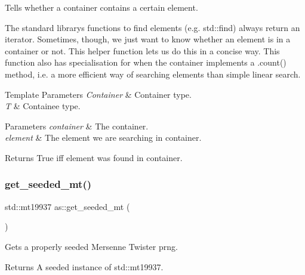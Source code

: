 Tells whether a container contains a certain element. 

The standard library\textquotesingle{}s functions to find elements (e.\+g. std\+::find) always return an iterator. Sometimes, though, we just want to know whether an element is in a container or not. This helper function lets us do this in a concise way. This function also has specialisation for when the container implements a .count() method, i.\+e. a more efficient way of searching elements than simple linear search.


\begin{DoxyTemplParams}{Template Parameters}
{\em Container} & Container type. \\
\hline
{\em T} & Containee type. \\
\hline
\end{DoxyTemplParams}

\begin{DoxyParams}{Parameters}
{\em container} & The container. \\
\hline
{\em element} & The element we are searching in {\ttfamily container}. \\
\hline
\end{DoxyParams}
\begin{DoxyReturn}{Returns}
True iff {\ttfamily element} was found in {\ttfamily container}. 
\end{DoxyReturn}
\mbox{\label{namespaceas_a4c9b0919bddf60796e9cc81ecd7d5bb2}} 
\subsubsection{\texorpdfstring{get\+\_\+seeded\+\_\+mt()}{get\_seeded\_mt()}}
{\footnotesize\ttfamily std\+::mt19937 as\+::get\+\_\+seeded\+\_\+mt (\begin{DoxyParamCaption}{ }\end{DoxyParamCaption})\hspace{0.3cm}{\ttfamily [inline]}}



Gets a properly seeded Mersenne Twister prng. 

\begin{DoxyReturn}{Returns}
A seeded instance of std\+::mt19937. 
\end{DoxyReturn}
\mbox{\label{namespaceas_aab6569c28591bebed9bd29b40c772bfc}} 
